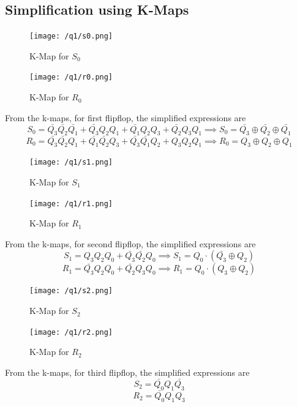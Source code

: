 \documentclass[a4paper]{article}
\begin{document}
\subsection{Simplification using K-Maps}
\begin{figure}[H]
    \centering
    \begin{minipage}[c]{0.45\textwidth}
        \centering
        \texttt{[image: /q1/s0.png]}
        \caption{K-Map for $S_{0}$}
    \end{minipage}
    \begin{minipage}[c]{0.45\textwidth}
        \centering
        \texttt{[image: /q1/r0.png]}
        \caption{K-Map for $R_{0}$}
    \end{minipage}
\end{figure}
From the k-maps, for first flipflop, the simplified expressions are $$S_{0} = \bar{Q_{3}}\bar{Q_{2}}\bar{Q_{1}} + \bar{Q_{3}}Q_{2}Q_{1}+\bar{Q_{1}}Q_{2}Q_{3}+\bar{Q_{2}}Q_{3}Q_{1} \implies S_{0} = \bar{Q_{3}}\oplus\bar{Q_{2}}\oplus\bar{Q_{1}}$$
$$R_{0} = \bar{Q_{3}}\bar{Q_{2}}Q_{1} + \bar{Q_{1}}\bar{Q_{2}}Q_{3}+\bar{Q_{3}}\bar{Q_{1}}Q_{2}+Q_{3}Q_{2}Q_{1} \implies R_{0} = Q_{3}\oplus Q_{2}\oplus Q_{1}$$

\begin{figure}[H]
    \centering
    \begin{minipage}[c]{0.45\textwidth}
        \centering
        \texttt{[image: /q1/s1.png]}
        \caption{K-Map for $S_{1}$}
    \end{minipage}
    \begin{minipage}[c]{0.45\textwidth}
        \centering
        \texttt{[image: /q1/r1.png]}
        \caption{K-Map for $R_{1}$}
    \end{minipage}
\end{figure}
From the k-maps, for second flipflop, the simplified expressions are
$$ S_{1} = Q_{3}Q_{2}Q_{0}+ \bar{Q_{3}}\bar{Q_{2}}Q_{0} \implies S_{1} = Q_{0}\cdot(\bar{Q_{3}}\oplus Q_{2})$$
$$ R_{1} = \bar{Q_{3}}Q_{2}Q_{0}+ \bar{Q_{2}}Q_{3}Q_{0} \implies R_{1} = Q_{0}\cdot(Q_{3}\oplus Q_{2})$$
\begin{figure}[H]
    \centering
    \begin{minipage}[c]{0.45\textwidth}
        \centering
        \texttt{[image: /q1/s2.png]}
        \caption{K-Map for $S_{2}$}
    \end{minipage}
    \begin{minipage}[c]{0.45\textwidth}
        \centering
        \texttt{[image: /q1/r2.png]}
        \caption{K-Map for $R_{2}$}
    \end{minipage}
\end{figure}
From the k-maps, for third flipflop, the simplified expressions are
$$S_{2}=\bar{Q_{0}}Q_{1}\bar{Q_{3}}$$
$$R_{2}=\bar{Q_{0}}Q_{1}Q_{3}$$
\end{document}
